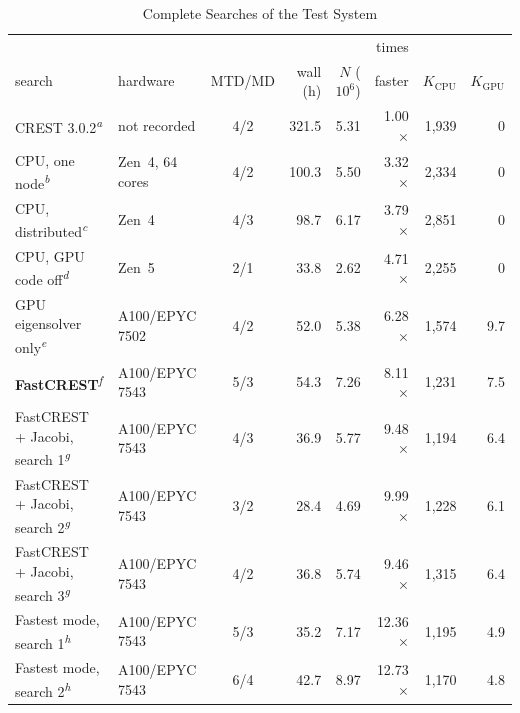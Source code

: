 \documentclass[journal=jctcce,manuscript=article]{achemso}
\begin{document}
\begin{table}[tbp]
\centering
\caption{Complete Searches of the Test System}
\label{tab:runs}
\small
\setlength{\tabcolsep}{3.3pt}
\begin{tabular}{@{}llcrrrrr@{}}
\toprule
 & & & & & times & & \\
search & hardware & MTD/MD & wall (h) & $N$ ($10^6$) & faster & $K_\mathrm{CPU}$ & $K_\mathrm{GPU}$ \\
\midrule
CREST 3.0.2\textsuperscript{\emph{a}} & not recorded & 4/2 & 321.5 & 5.31 & 1.00$\times$ & 1,939 & 0 \\
CPU, one node\textsuperscript{\emph{b}} & Zen~4, 64 cores & 4/2 & 100.3 & 5.50 & 3.32$\times$ & 2,334 & 0 \\
CPU, distributed\textsuperscript{\emph{c}} & Zen~4 & 4/3 & 98.7 & 6.17 & 3.79$\times$ & 2,851 & 0 \\
CPU, GPU code off\textsuperscript{\emph{d}} & Zen~5 & 2/1 & 33.8 & 2.62 & 4.71$\times$ & 2,255 & 0 \\
GPU eigensolver only\textsuperscript{\emph{e}} & A100/EPYC 7502 & 4/2 & 52.0 & 5.38 & 6.28$\times$ & 1,574 & 9.7 \\
\textbf{FastCREST}\textsuperscript{\emph{f}} & A100/EPYC 7543 & 5/3 & 54.3 & 7.26 & 8.11$\times$ & 1,231 & 7.5 \\
FastCREST + Jacobi, search 1\textsuperscript{\emph{g}} & A100/EPYC 7543 & 4/3 & 36.9 & 5.77 & 9.48$\times$ & 1,194 & 6.4 \\
FastCREST + Jacobi, search 2\textsuperscript{\emph{g}} & A100/EPYC 7543 & 3/2 & 28.4 & 4.69 & 9.99$\times$ & 1,228 & 6.1 \\
FastCREST + Jacobi, search 3\textsuperscript{\emph{g}} & A100/EPYC 7543 & 4/2 & 36.8 & 5.74 & 9.46$\times$ & 1,315 & 6.4 \\
Fastest mode, search 1\textsuperscript{\emph{h}} & A100/EPYC 7543 & 5/3 & 35.2 & 7.17 & 12.36$\times$ & 1,195 & 4.9 \\
Fastest mode, search 2\textsuperscript{\emph{h}} & A100/EPYC 7543 & 6/4 & 42.7 & 8.97 & 12.73$\times$ & 1,170 & 4.8 \\
\bottomrule
\end{tabular}


\end{table}
\end{document}
